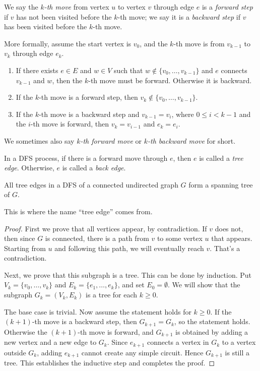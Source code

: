 \begin{definition}
    We say the \emph{$k$-th move} from vertex $u$ to vertex $v$ through edge $e$ is a \emph{forward step} if $v$ has not been visited before the $k$-th move; we say it is a \emph{backward step} if $v$ has been visited before the $k$-th move.

    More formally, assume the start vertex is $v_0$, and the $k$-th move is from $v_{k-1}$ to $v_k$ through edge $e_k$. 
    \begin{enumerate}[itemindent=0ex, itemsep=0pt, label=\upshape{(\alph*)}]
        \item If there exists $e\in E$ and $w\in V$ such that $w\not\in\{v_0,\dots, v_{k-1}\}$ and $e$ connects $v_{k-1}$ and $w$, then the $k$-th move must be forward. Otherwise it is backward.
        \item If the $k$-th move is a forward step, then $v_k\not\in\{v_0,\dots,v_{k-1}\}$.
        \item If the $k$-th move is a backward step and $v_{k-1}=v_i$, where $0\leq i<k-1$ and the $i$-th move is forward, then $v_k=v_{i-1}$ and $e_k=e_i$.
    \end{enumerate}

    We sometimes also say \emph{$k$-th forward move} or \emph{$k$-th backward move} for short.
\end{definition}

\begin{definition}
    In a DFS process, if there is a forward move through $e$, then $e$ is called a \emph{tree edge}. Otherwise, $e$ is called a \emph{back edge}.
\end{definition}

\begin{theorem}
    All tree edges in a DFS of a connected undirected graph $G$ form a spanning tree of $G$.
\end{theorem}

This is where the name ``tree edge'' comes from. 

\begin{proof}
    First we prove that all vertices appear, by contradiction. If $v$ does not, then since $G$ is connected, there is a path from $v$ to some vertex $u$ that appears. Starting from $u$ and following this path, we will eventually reach $v$. That's a contradiction. 

    Next, we prove that this subgraph is a tree. This can be done by induction. Put $V_k=\{v_0,\dots,v_k\}$ and $E_k=\{e_1,\dots,e_k\}$, and set $E_0=\emptyset$. We will show that the subgraph $G_k=(V_k,E_k)$ is a tree for each $k\geq 0$. 
    
    The base case is trivial. Now assume the statement holds for $k\geq 0$. If the $(k+1)$-th move is a backward step, then $G_{k+1}=G_k$, so the statement holds. Otherwise the $(k+1)$-th move is forward, and $G_{k+1}$ is obtained by adding a new vertex and a new edge to $G_k$. Since $e_{k+1}$ connects a vertex in $G_k$ to a vertex outside $G_k$, adding $e_{k+1}$ cannot create any simple circuit. Hence $G_{k+1}$ is still a tree. This establishes the inductive step and completes the proof.
\end{proof}

